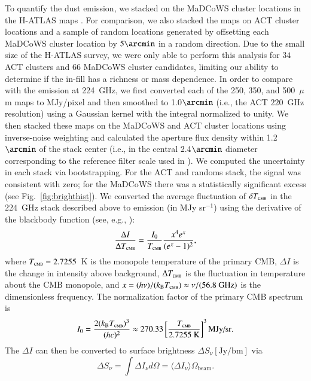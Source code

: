 \documentclass[longauth]{aa} %
\newcommand{\madcows}{MaDCoWS\xspace}
\begin{document}
To quantify the dust emission, we stacked on the MaDCoWS cluster locations in the H-ATLAS maps \citep{Valiante_2016,Smith_2017}. For comparison, we also stacked the maps on ACT cluster locations and a sample of random locations generated by offsetting each MaDCoWS cluster location by $5\arcmin$ in a random direction. Due to the small size of the H-ATLAS survey, we were only able to perform this analysis for $34$ ACT clusters and 66 \madcows cluster candidates, limiting our ability to determine if the in-fill has a richness or mass dependence. In order to compare with the emission at 224~GHz, we first converted each of the 250, 350, and 500~$\mu$m maps to MJy/pixel and then smoothed to 1.0$\arcmin$ (i.e., the ACT $220$~GHz resolution) using a Gaussian kernel with the integral normalized to unity. We then stacked these maps on the MaDCoWS and ACT cluster locations using inverse-noise weighting and calculated the aperture flux density within 1.2$\arcmin$ of the stack center (i.e., in the central 2.4$\arcmin$ diameter corresponding to the reference filter scale used in \cite{Hilton2021}). We computed the uncertainty in each stack via bootstrapping. For the ACT and randoms stack, the signal was consistent with zero; for the \madcows there was a statistically significant excess (see Fig.~\ref{fig:brighthist}). We converted the average fluctuation of $\delta T_\textsc{cmb}$ in the $224$~GHz stack described above to emission (in MJy sr$^{-1}$) using the derivative of the blackbody function (see, e.g., \citealt{Mroczkowski2019}):
\begin{equation}
    \frac{\Delta I}{\Delta T_{\textsc{cmb}}} = \frac{I_0}{T_{\textsc{cmb}}} \frac{x^4 e^x}{(e^x-1)^2},
\end{equation}
where $T_\textsc{cmb} = 2.7255$~K is the monopole temperature of the primary CMB, $\Delta I$ is the change in intensity above background, $\Delta T_{\textsc{cmb}}$ is the fluctuation in temperature about the CMB monopole, and $x = (h\nu)/(k_{\text{B}} T_{\textsc{cmb}}) \approx \nu/(56.8~\rm GHz)$ is the dimensionless frequency. The normalization factor of the primary CMB spectrum is
\begin{equation}
    I_0 = \frac{2(k_{\text{B}} T_{\textsc{cmb}})^3}{(hc)^2} \approx 270.33 \left[ \frac{T_{\textsc{cmb}}}{2.7255~\text{K}}\right]^3 \text{MJy/sr}.
\end{equation}
The $\Delta I$ can then be converted to surface brightness $\Delta S_{\nu} \left[ \text{Jy/bm}\right]$ via
\begin{equation}
    \Delta S_{\nu} = \int \Delta I_{\nu} d\Omega = \langle \Delta I_{\nu} \rangle \Omega_{\text{beam}}.
\end{equation}
\end{document}
